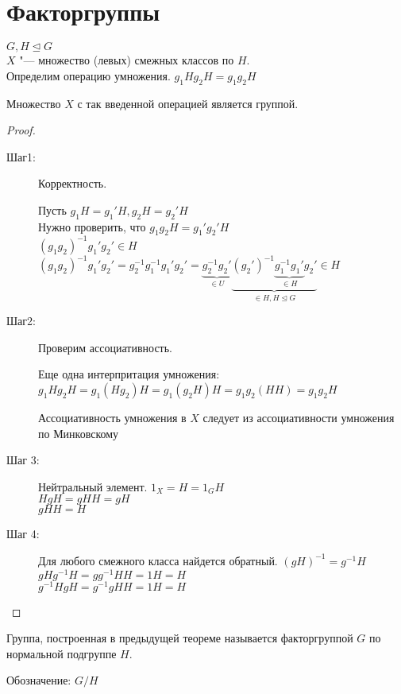 ﻿\section{Факторгруппы}
$G, H \unlhd G$\\
$X$ "--- множество (левых) смежных классов по $H$.\\
Определим операцию умножения. 
$g_1H g_2H = g_1g_2H$
\begin{theorem}
Множество $X$ с так введенной операцией является группой. 
\end{theorem}
\begin{proof}
\begin{description}
\item[Шаг1:]
Корректность. 

Пусть $g_1H = g_1'H, g_2H = g_2'H$\\
Нужно проверить, что $g_1g_2H = g_1'g_2'H$\\

$(g_1g_2)^{-1}g_1'g_2' \in H$\\
$(g_1g_2)^{-1}g_1'g_2' = g_2^{-1}g_1^{-1}g_1'g_2' = \underbrace{g_2^{-1}g_2'}_{\in U} \underbrace{(g_2')^{-1} \underbrace{g_1^{-1}g_1'}_{\in H}g_2'}_{\in H, H \unlhd G} \in H$\\
\item [Шаг2:]
Проверим ассоциативность.

Еще одна интерпритация умножения:
$g_1Hg_2H = g_1(Hg_2)H = g_1(g_2H)H = g_1g_2(HH) = g_1g_2H$


Ассоциативность умножения в $X$ следует  из ассоциативности умножения по Минковскому\\
\item [Шаг 3:]
Нейтральный элемент. 
$1_X = H = 1_GH$\\
$HgH = gHH = gH$\\
$gHH = H$\\
\item [Шаг 4:]
Для любого смежного класса найдется обратный. 
$(gH)^{-1} = g^{-1}H$\\
$gHg^{-1}H = gg^{-1}HH = 1H = H$\\
$g^{-1}HgH = g^{-1}gHH = 1H = H$\\
\end{description}
\end{proof}
\begin{Def}
Группа, построенная в предыдущей теореме называется факторгруппой $G$ по нормальной подгруппе $H$.

Обозначение: $G / H$\\
\end{Def}

